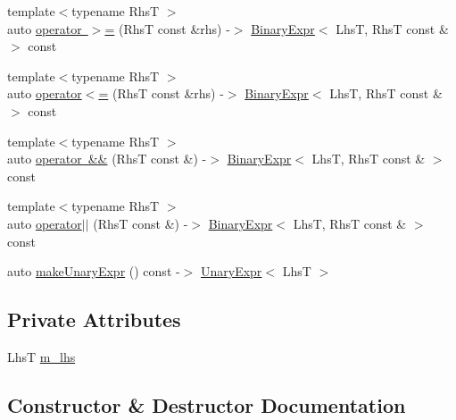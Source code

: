 \begin{DoxyCompactItemize}
\item 
{\footnotesize template$<$typename RhsT $>$ }\\auto \mbox{\hyperlink{class_catch_1_1_expr_lhs_a621240eaaf40e186cd96511c1d29d7b0}{operator $>$=}} (RhsT const \&rhs) -\/$>$ \mbox{\hyperlink{class_catch_1_1_binary_expr}{Binary\+Expr}}$<$ LhsT, RhsT const \& $>$ const
\item 
{\footnotesize template$<$typename RhsT $>$ }\\auto \mbox{\hyperlink{class_catch_1_1_expr_lhs_a918090c28bee54222730159b56240af1}{operator$<$=}} (RhsT const \&rhs) -\/$>$ \mbox{\hyperlink{class_catch_1_1_binary_expr}{Binary\+Expr}}$<$ LhsT, RhsT const \& $>$ const
\item 
{\footnotesize template$<$typename RhsT $>$ }\\auto \mbox{\hyperlink{class_catch_1_1_expr_lhs_ab7d8d931db0dcff46fb1d23114c738c0}{operator \&\&}} (RhsT const \&) -\/$>$ \mbox{\hyperlink{class_catch_1_1_binary_expr}{Binary\+Expr}}$<$ LhsT, RhsT const \& $>$ const
\item 
{\footnotesize template$<$typename RhsT $>$ }\\auto \mbox{\hyperlink{class_catch_1_1_expr_lhs_ae9b4ee923b90af22c9e39261c2f03cd3}{operator$\vert$$\vert$}} (RhsT const \&) -\/$>$ \mbox{\hyperlink{class_catch_1_1_binary_expr}{Binary\+Expr}}$<$ LhsT, RhsT const \& $>$ const
\item 
auto \mbox{\hyperlink{class_catch_1_1_expr_lhs_ab68bd6d5d3ae21b7fba9010150fba95d}{make\+Unary\+Expr}} () const -\/$>$ \mbox{\hyperlink{class_catch_1_1_unary_expr}{Unary\+Expr}}$<$ LhsT $>$
\end{DoxyCompactItemize}
\subsection*{Private Attributes}
\begin{DoxyCompactItemize}
\item 
LhsT \mbox{\hyperlink{class_catch_1_1_expr_lhs_af290873a8427ccbdae6acb915fb7366a}{m\+\_\+lhs}}
\end{DoxyCompactItemize}


\subsection{Constructor \& Destructor Documentation}
\mbox{\label{class_catch_1_1_expr_lhs_ad22c6af1a7d6993240624d299714a479}} 
